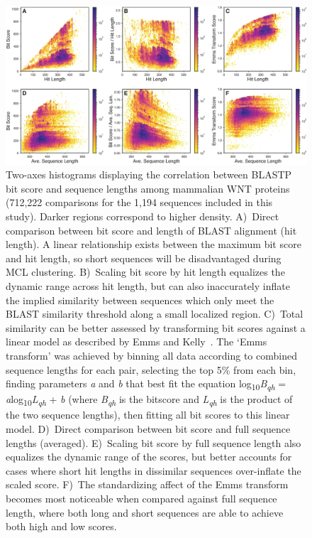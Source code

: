\documentclass[twocolumn]{bmcart}  %
\begin{document}
\begin{figure}[t]
  \begin{center}
  \includegraphics[height=0.34\textheight]{../figures/Bitscore_transforms.eps}
\end{center}
\caption{Two-axes histograms displaying the correlation between BLASTP bit score and sequence lengths among mammalian WNT proteins (712,222 comparisons for the 1,194 sequences included in this study).
Darker regions correspond to higher density.
A)~Direct comparison between bit score and length of BLAST alignment (hit length).
A linear relationship exists between the maximum bit score and hit length, so short sequences will be disadvantaged during MCL clustering.
B)~Scaling bit score by hit length equalizes the dynamic range across hit length, but can also inaccurately inflate the implied similarity between sequences which only meet the BLAST similarity threshold along a small localized region.
C)~Total similarity can be better assessed by transforming bit scores against a linear model as described by Emms and Kelly~\cite{Emms:2015ig}.
The `Emms transform' was achieved by binning all data according to combined sequence lengths for each pair, selecting the top 5\% from each bin, finding parameters \textit{a} and \textit{b} that best fit the equation log\textsubscript{10}\textit{B\textsubscript{qh}} = \textit{a}log\textsubscript{10}\textit{L\textsubscript{qh}} + \textit{b} (where \textit{B\textsubscript{qh}} is the bitscore and \textit{L\textsubscript{qh}} is the product of the two sequence lengths), then fitting all bit scores to this linear model.
D)~Direct comparison between bit score and full sequence lengths (averaged).
E)~Scaling bit score by full sequence length also equalizes the dynamic range of the scores, but better accounts for cases where short hit lengths in dissimilar sequences over-inflate the scaled score.
F)~The standardizing affect of the Emms transform becomes most noticeable when compared against full sequence length, where both long and short sequences are able to achieve both high and low scores.
}
\label{fig:Bitscores}
\end{figure}
\end{document}
